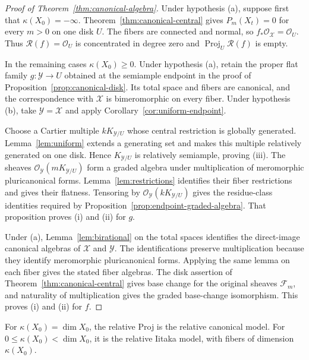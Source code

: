 \documentclass[11pt,a4paper]{article}
\numberwithin{equation}{section}
\theoremstyle{definition}
\theoremstyle{remark}
\newcommand{\OO}{\mathcal O}\newcommand{\cX}{\mathcal X}
\newcommand{\Proj}{\operatorname{Proj}}
\begin{document}
\begin{proof}[Proof of Theorem~\ref{thm:canonical-algebra}]
Under hypothesis \textup{(a)}, suppose first that
$\kappa(X_0)=-\infty$. Theorem~\ref{thm:canonical-central}
gives $P_m(X_t)=0$ for every $m>0$ on one disk $U$. The fibers are
connected and normal, so $f_*\OO_{\mathcal X}=\OO_U$.
Thus $\mathcal R(f)=\OO_U$ is concentrated in degree zero and
$\Proj_U\mathcal R(f)$ is empty.

In the remaining cases $\kappa(X_0)\ge0$. Under hypothesis \textup{(a)},
retain the proper flat family $g:\mathcal Y\to U$ obtained at the
semiample endpoint in the proof of
Proposition~\ref{prop:canonical-disk}. Its total space and fibers are
canonical, and the correspondence with $\mathcal X$ is bimeromorphic
on every fiber. Under hypothesis \textup{(b)}, take
$\mathcal Y=\mathcal X$ and apply
Corollary~\ref{cor:uniform-endpoint}.

Choose a Cartier multiple $kK_{\mathcal Y/U}$ whose central
restriction is globally generated. Lemma~\ref{lem:uniform} extends
a generating set and makes this multiple relatively generated on
one disk. Hence $K_{\mathcal Y/U}$ is relatively semiample, proving
\textup{(iii)}.
The sheaves $\OO_{\mathcal Y}(mK_{\mathcal Y/U})$ form a graded
algebra under multiplication of meromorphic pluricanonical forms.
Lemma~\ref{lem:restrictions} identifies their fiber restrictions and
gives their flatness. Tensoring by $\OO_{\mathcal Y}(kK_{\mathcal Y/U})$
gives the residue-class identities required by
Proposition~\ref{prop:endpoint-graded-algebra}. That proposition proves
\textup{(i)} and \textup{(ii)} for $g$.

Under \textup{(a)}, Lemma~\ref{lem:birational} on the total spaces
identifies the direct-image canonical algebras of $\mathcal X$ and
$\mathcal Y$. The identifications preserve multiplication because
they identify meromorphic pluricanonical forms. Applying the same
lemma on each fiber gives the stated fiber algebras.
The disk assertion of Theorem~\ref{thm:canonical-central} gives base change for the original
sheaves $\mathcal F_m$, and naturality of multiplication gives the
graded base-change isomorphism. This proves \textup{(i)} and
\textup{(ii)} for $f$.
\end{proof}

For $\kappa(X_0)=\dim X_0$, the relative Proj is the relative
canonical model. For $0\le\kappa(X_0)<\dim X_0$, it is the relative
Iitaka model, with fibers of dimension $\kappa(X_0)$.
\end{document}
